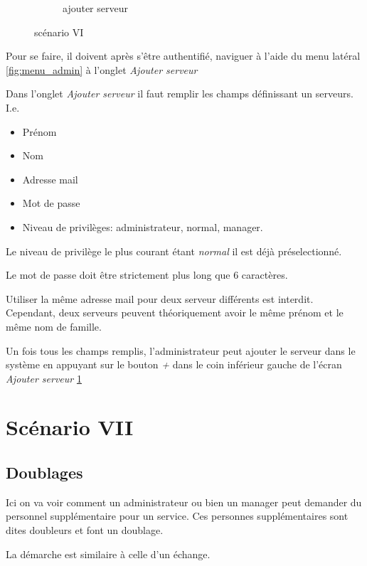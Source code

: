 \begin{figure}[!h]
\begin{subfigure}{.45\textwidth}
            \caption{ajouter serveur}
            \label{fig:ajout_serveur}
        \end{subfigure}
        \caption{scénario VI}
        \label{fig:scen06}
    \end{figure}

    Pour se faire, il doivent après s'être authentifié, naviguer à l'aide 
    du menu latéral \ref{fig:menu_admin} à l'onglet \textit{Ajouter serveur}

    Dans l'onglet \textit{Ajouter serveur} il faut remplir les champs définissant un serveurs. I.e. 
    \begin{itemize}
        \item Prénom
        \item Nom 
        \item Adresse mail
        \item Mot de passe
        \item Niveau de privilèges: administrateur, normal, manager. 
    \end{itemize}

    Le niveau de privilège le plus courant étant \textit{normal} il est déjà 
    préselectionné.

    Le mot de passe doit être strictement plus long que 6 caractères.

    Utiliser la même adresse mail pour deux serveur différents est interdit. 
    Cependant, deux serveurs peuvent théoriquement avoir le même prénom et le même nom de 
    famille.

    Un fois tous les champs remplis, l'administrateur peut ajouter le serveur
    dans le système en appuyant sur le bouton \textit{+} dans le coin inférieur
    gauche de l'écran \textit{Ajouter serveur} \ref{fig:ajout_serveur}

    \section[Doublages - Scénario VII]{Scénario VII}
        \subsection*{Doublages}
        Ici on va voir comment un administrateur ou bien un manager peut demander
        du personnel supplémentaire pour un service. Ces personnes supplémentaires sont dites 
        doubleurs et font un doublage.

        La démarche est similaire à celle d'un échange.


